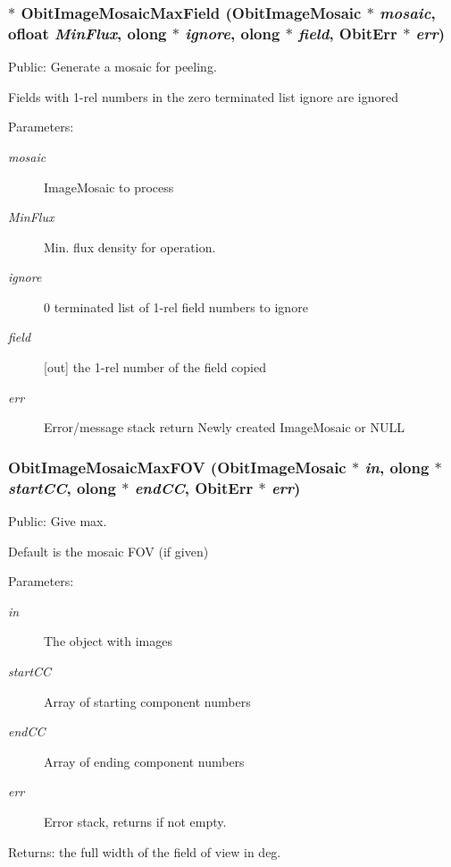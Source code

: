 \subsubsection{$\ast$ Obit\-Image\-Mosaic\-Max\-Field ({\bf Obit\-Image\-Mosaic} $\ast$ {\em mosaic}, {\bf ofloat} {\em Min\-Flux}, {\bf olong} $\ast$ {\em ignore}, {\bf olong} $\ast$ {\em field}, {\bf Obit\-Err} $\ast$ {\em err})}\label{ObitImageMosaic_8c_a30}


Public: Generate a mosaic for peeling. 

Fields with 1-rel numbers in the zero terminated list ignore are ignored \begin{Desc}
\item[Parameters:]
\begin{description}
\item[{\em mosaic}]Image\-Mosaic to process \item[{\em Min\-Flux}]Min. flux density for operation. \item[{\em ignore}]0 terminated list of 1-rel field numbers to ignore \item[{\em field}][out] the 1-rel number of the field copied \item[{\em err}]Error/message stack return Newly created Image\-Mosaic or NULL \end{description}
\end{Desc}
\subsubsection{ Obit\-Image\-Mosaic\-Max\-FOV ({\bf Obit\-Image\-Mosaic} $\ast$ {\em in}, {\bf olong} $\ast$ {\em start\-CC}, {\bf olong} $\ast$ {\em end\-CC}, {\bf Obit\-Err} $\ast$ {\em err})}\label{ObitImageMosaic_8c_a27}


Public: Give max. 

Default is the mosaic FOV (if given) \begin{Desc}
\item[Parameters:]
\begin{description}
\item[{\em in}]The object with images \item[{\em start\-CC}]Array of starting component numbers \item[{\em end\-CC}]Array of ending component numbers \item[{\em err}]Error stack, returns if not empty. \end{description}
\end{Desc}
\begin{Desc}
\item[Returns:]the full width of the field of view in deg. \end{Desc}
